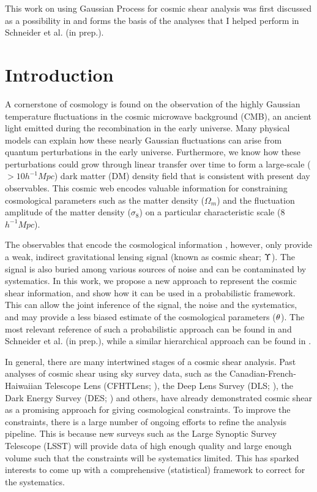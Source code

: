  
This work on using Gaussian Process for cosmic shear analysis 
was first discussed as a possibility in  \citep{Schneider2014}  and 
forms the basis of the analyses that I helped perform 
in Schneider et al. (in prep.). 

\section{Introduction} 

A cornerstone of cosmology is found on the 
observation of the highly Gaussian temperature fluctuations in the cosmic microwave 
background (CMB), an ancient light emitted during the recombination in the early
universe. Many physical models can explain how these
nearly Gaussian fluctuations can arise from quantum perturbations in the 
early universe. Furthermore, we know how these perturbations could grow
through linear transfer over time to form a large-scale ($> 10 h^{-1} Mpc$) 
dark matter (DM) density field that is consistent with present
day observables. 
This cosmic web encodes valuable information for constraining cosmological
parameters such as the matter density ($\Omega_m$) and the fluctuation amplitude 
of the matter density ($\sigma_8$) on a particular characteristic scale (8
$h^{-1} Mpc$).  

The observables that encode the cosmological information , 
however, only provide a weak, indirect gravitational lensing signal (known as cosmic
shear; $\Upsilon$). The signal is also buried among various sources of noise
and can be contaminated by systematics. 
In this work, we propose a new approach to represent the cosmic shear information, 
and show how it can be used in a probabilistic framework. 
This can allow 
the joint inference of the signal, the noise and the systematics, 
and may provide a less biased 
estimate of the cosmological parameters (${\bf \theta}$). 
The most relevant reference of such a probabilistic approach can be found in 
\cite{Schneider2014} and Schneider et al. (in prep.), 
while a similar hierarchical approach can be found in \cite{Alsing2015}. 

In general, there are many intertwined 
stages of a cosmic shear analysis. Past analyses of cosmic shear using sky survey data, such as
the Canadian-French-Haiwaiian Telescope Lens (CFHTLens;
\citealt{Kilbinger2013}), the Deep Lens Survey
(DLS; \citealt{Jee2013a}), the Dark Energy Survey (DES; \citealt{Abbott2016}) and others, 
have already demonstrated cosmic shear as a promising approach for giving cosmological 
constraints. To improve the constraints, there is a large number of ongoing 
efforts to refine the analysis pipeline. 
This is because new surveys such as the Large Synoptic Survey Telescope (LSST) will
provide data of high enough quality and large enough volume such that the
constraints will be systematics limited. This has sparked interests to
come up with a comprehensive (statistical) framework to correct for the systematics. 

